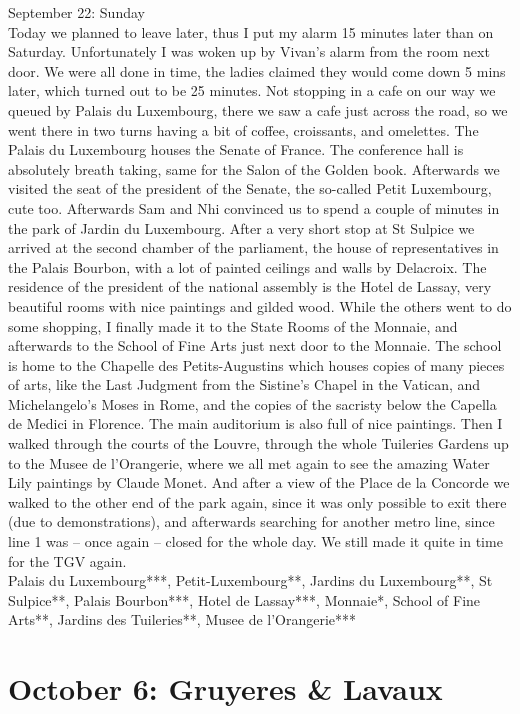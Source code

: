 September 22: Sunday\\
Today we planned to leave later, thus I put my alarm 15 minutes later than on Saturday. Unfortunately I was woken up by Vivan's alarm from the room next door. We were all done in time, the ladies claimed they would come down 5 mins later, which turned out to be 25 minutes. Not stopping in a cafe on our way we queued by Palais du Luxembourg, there we saw a cafe just across the road, so we went there in two turns having a bit of coffee, croissants, and omelettes. The Palais du Luxembourg houses the Senate of France. The conference hall is absolutely breath taking, same for the Salon of the Golden book. Afterwards we visited the seat of the president of the Senate, the so-called Petit Luxembourg, cute too. Afterwards Sam and Nhi convinced us to spend a couple of minutes in the park of Jardin du Luxembourg. After a very short stop at St Sulpice we arrived at the second chamber of the parliament, the house of representatives in the Palais Bourbon, with a lot of painted ceilings and walls by Delacroix. The residence of the president of the national assembly is the Hotel de Lassay, very beautiful rooms with nice paintings and gilded wood. While the others went to do some shopping, I finally made it to the State Rooms of the Monnaie, and afterwards to the School of Fine Arts just next door to the Monnaie. The school is home to the Chapelle des Petits-Augustins which houses copies of many pieces of arts, like the Last Judgment from the Sistine's Chapel in the Vatican, and Michelangelo's Moses in Rome, and the copies of the sacristy below the Capella de Medici in Florence. The main auditorium is also full of nice paintings. Then I walked through the courts of the Louvre, through the whole Tuileries Gardens up to the Musee de l'Orangerie, where we all met again to see the amazing Water Lily paintings by Claude Monet. And after a view of the Place de la Concorde we walked to the other end of the park again, since it was only possible to exit there (due to demonstrations), and afterwards searching for another metro line, since line 1 was -- once again -- closed for the whole day. We still made it quite in time for the TGV again.\\

Palais du Luxembourg***, Petit-Luxembourg**, Jardins du Luxembourg**, St Sulpice**, Palais Bourbon***, Hotel de Lassay***, Monnaie*, School of Fine Arts**, Jardins des Tuileries**, Musee de l'Orangerie***

\section{October 6: Gruyeres \& Lavaux}
\label{2019:Gruyeres}

